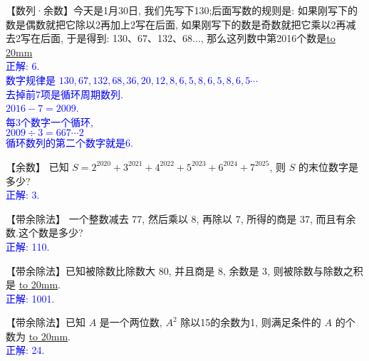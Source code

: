 \item {
    【数列·余数】今天是1月30日, 我们先写下130;后面写数的规则是: 如果刚写下的数是偶数就把它除以2再加上2写在后面, 如果刚写下的数是奇数就把它乘以2再减去2写在后面, 于是得到: 130、67、132、68..., 那么这列数中第2016个数是\underline{\hbox to 20mm{}}
    \ifshowSolution
        \\\fangsong{}\textcolor{blue}{
            正解: 6.\\
            数字规律是 $130,67,132,68,36,20,12,8,6,5,8,6,5,8,6,5\cdots$\\
            去掉前7项是循环周期数列.\\
            $2016-7=2009$.\\
            每3个数字一个循环,\\
            $ 2009\div 3 = 667\cdots 2$\\
            循环数列的第二个数字就是6.
        }
    \else
        \vspace{1cm}
    \fi
}

\item {
    【余数】
    已知 $S = 2^{2020} + 3^{2021} + 4^{2022} + 5^{2023} +6^{2024} + 7^{2025}$, 则 $S$ 的末位数字是多少? 
    \ifshowSolution
        \\\fangsong{}\textcolor{blue}{
            正解: 3.
        }
    \else
        \vspace{1cm}
    \fi
}

\item {
    【带余除法】
    一个整数减去 77, 然后乘以 8, 再除以 7, 所得的商是 37, 而且有余数.这个数是多少? 
    \ifshowSolution
        \\\fangsong{}\textcolor{blue}{
            正解: 110.
        }
    \else
        \vspace{1cm}
    \fi
}

\item {
    【带余除法】已知被除数比除数大 80, 并且商是 8, 余数是 3, 则被除数与除数之积是 \underline{\hbox to 20mm{}}.
    \ifshowSolution
        \\\fangsong{}\textcolor{blue}{
            正解: 1001.
        }
    \else
        \vspace{1cm}
    \fi
}

\item {
    【带余除法】已知 $A$ 是一个两位数, $A^2$ 除以15的余数为1, 则满足条件的 $A$ 的个数为 \underline{\hbox to 20mm{}}.
    \ifshowSolution
        \\\fangsong{}\textcolor{blue}{
            正解: 24.
        }
    \else
        \vspace{1cm}
    \fi
}

